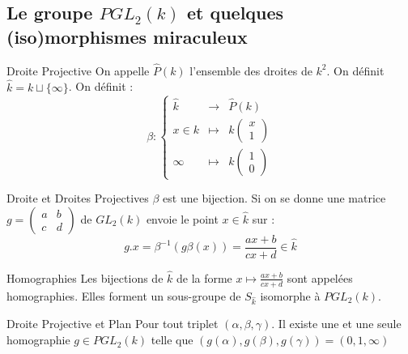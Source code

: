 \documentclass{cours}
\begin{document}
\subsection{Le groupe $PGL_{2}(k)$ et quelques (iso)morphismes miraculeux}
\begin{définition}{Droite Projective}{}
    On appelle $\hat{P}(k)$ l'ensemble des droites de $k^{2}$. On définit $\hat{k} = k \sqcup \{\infty\}$. On définit :
    \[
        \beta : \left\{\begin{array}{ccc}
            \hat{k} & \longrightarrow & \hat{P}(k)                                   \\
            x \in k & \longmapsto     & k\left(\begin{array}{c} x \\ 1
                                                   \end{array}\right) \\
            \infty  & \longmapsto     & k\left(\begin{array}{c} 1 \\ 0
                                                   \end{array}\right)
        \end{array}\right.
    \]
\end{définition}

\begin{propositionfr}{Droite et Droites Projectives}{}
    $\beta$ est une bijection. Si on se donne une matrice $g = \left(\begin{array}{cc} a & b \\ c & d
            \end{array}\right)$ de $GL_{2}(k)$ envoie le point $x \in \hat{k}$ sur :
    \[
        g.x = \beta^{-1}\left(g\beta(x)\right) = \frac{ax + b}{cx + d} \in \hat{k}
    \]
\end{propositionfr}

\begin{définition}{Homographies}{}
    Les bijections de $\hat{k}$ de la forme $x \mapsto \frac{ax +b}{cx +d}$ sont appelées homographies. Elles forment un sous-groupe de $S_{\hat{k}}$ isomorphe à $PGL_{2}(k)$.
\end{définition}
\begin{propositionfr}{Droite Projective et Plan}{}
    Pour tout triplet $\left(\alpha, \beta, \gamma\right)$. Il existe une et une seule homographie $g \in PGL_{2}(k)$ telle que $\left(g(\alpha), g(\beta), g(\gamma)\right) = \left(0, 1, \infty\right)$
\end{propositionfr}
\end{document}
